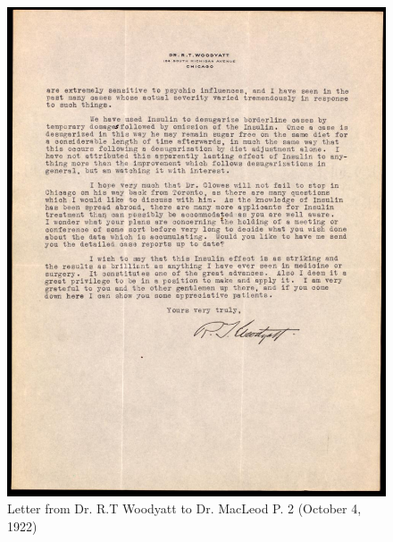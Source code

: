 \documentclass[12pt]{article}
\begin{document}
\begin{figure}[H]
\centering
  \includegraphics [width=5in]{mental_manp2}
  \caption{Letter from Dr. R.T Woodyatt to Dr. MacLeod P. 2 (October 4, 1922)}
  \label{fig: Letter from Dr. R. T. Woodyatt to Dr. MacLeod P. 2}
\end{figure}



\newpage
\singlespacing


\end{document}
